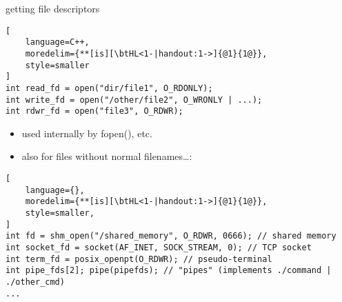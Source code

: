 
\begin{frame}[fragile,label=gettingFds]{getting file descriptors}
\begin{lstlisting}[
    language=C++,
    moredelim={**[is][\btHL<1-|handout:1->]{@1}{1@}},
    style=smaller
]
int read_fd = open("dir/file1", O_RDONLY);
int write_fd = open("/other/file2", O_WRONLY | ...);
int rdwr_fd = open("file3", O_RDWR);
\end{lstlisting}
\begin{itemize}
\item used internally by fopen(), etc.
\item also for files without normal filenames\ldots:
\end{itemize}
\begin{lstlisting}[
    language={},
    moredelim={**[is][\btHL<1-|handout:1->]{@1}{1@}},
    style=smaller,
]
int fd = shm_open("/shared_memory", O_RDWR, 0666); // shared memory
int socket_fd = socket(AF_INET, SOCK_STREAM, 0); // TCP socket
int term_fd = posix_openpt(O_RDWR); // pseudo-terminal
int pipe_fds[2]; pipe(pipefds); // "pipes" (implements ./command | ./other_cmd)
...
\end{lstlisting}
\end{frame}
